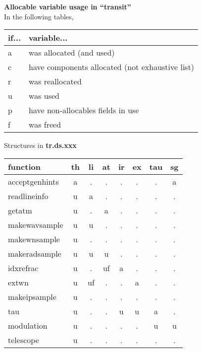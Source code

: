 \documentclass{article}
\begin{document}
\begin{center}
{\large {\bf Allocable variable usage in ``transit''}}\\[1cm]
In the following tables, \\
\begin{tabular}{ll}
if... & variable...\\
\hline
a & was allocated (and used) \\
c & have components allocated (not exhaustive list) \\
r & was reallocated \\
u & was used \\
p & have non-allocables fields in use \\
f & was freed \\
\end{tabular}
\end{center}

\vspace{1cm}

\begin{center}
{\large Structures in {\bf tr.ds.xxx}}\\[1cm]
\begin{tabular}{l|ccccccc}
function
  & th & li & at & ir & ex & tau & sg \\
\hline 	 	    				 
acceptgenhints			 
  & a  & .  & .  & .  & .  & .   & a  \\
readlineinfo			 
  & u  & a  & .  & .  & .  & .   & .  \\
getatm 	 	    				 
  & u  & .  & a  & .  & .  & .   & .  \\
makewavsample			 
  & u  & u  & .  & .  & .  & .   & .  \\
makewnsample			 
  & u  & .  & .  & .  & .  & .   & .  \\
makeradsample			 
  & u  & u  & u  & .  & .  & .   & .  \\
idxrefrac   			 
  & u  & .  & uf & a  & .  & .   & .  \\
extwn  	 	    				 
  & u  & uf & .  & .  & a  & .   & .  \\
makeipsample			 
  & u  & .  & .  & .  & .  & .   & .  \\
tau    	 	    				 
  & u  & .  & .  & u  & u  & a   & .  \\
modulation  			 
  & u  & .  & .  & .  & .  & u   & u  \\
telescope   			 
  & u  & .  & .  & .  & .  & .   & .  \\
\hline
\end{tabular}
\end{center}
\end{document}
